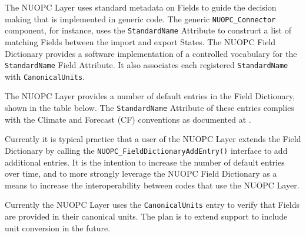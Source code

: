 %

\label{field_dictionary}

The NUOPC Layer uses standard metadata on Fields to guide the decision making that is implemented in generic code. The generic {\tt NUOPC\_Connector} component, for instance, uses the {\tt StandardName} Attribute to construct a list of matching Fields between the import and export States. The NUOPC Field Dictionary provides a software implementation of a controlled vocabulary for the {\tt StandardName} Field Attribute. It also associates each registered {\tt StandardName} with {\tt CanonicalUnits}.

The NUOPC Layer provides a number of default entries in the Field Dictionary, shown in the table below. The {\tt StandardName} Attribute of these entries complies with the Climate and Forecast (CF) conventions as documented at . 

Currently it is typical practice that a user of the NUOPC Layer extends the Field Dictionary by calling the {\tt  NUOPC\_FieldDictionaryAddEntry()} interface to add additional entries. It is the intention to increase the number of default entries over time, and to more strongly leverage the NUOPC Field Dictionary as a means to increase the interoperability between codes that use the NUOPC Layer.

Currently the NUOPC Layer uses the {\tt CanonicalUnits} entry to verify that Fields are provided in their canonical units. The plan is to extend support to include unit conversion in the future.
